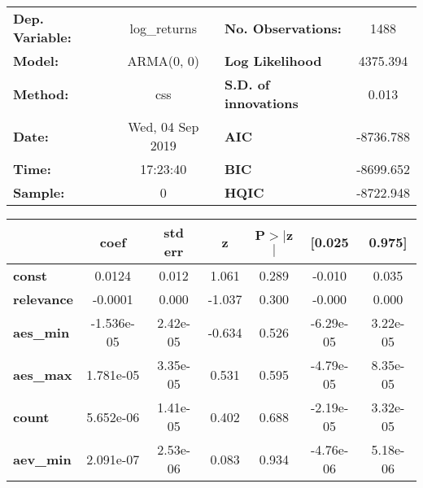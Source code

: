 \begin{center}
\begin{tabular}{lclc}
\toprule
\textbf{Dep. Variable:} &   log\_returns   & \textbf{  No. Observations:  } &    1488     \\
\textbf{Model:}         &    ARMA(0, 0)    & \textbf{  Log Likelihood     } &  4375.394   \\
\textbf{Method:}        &       css        & \textbf{  S.D. of innovations} &   0.013     \\
\textbf{Date:}          & Wed, 04 Sep 2019 & \textbf{  AIC                } & -8736.788   \\
\textbf{Time:}          &     17:23:40     & \textbf{  BIC                } & -8699.652   \\
\textbf{Sample:}        &        0         & \textbf{  HQIC               } & -8722.948   \\
\bottomrule
\end{tabular}
\begin{tabular}{lcccccc}
                   & \textbf{coef} & \textbf{std err} & \textbf{z} & \textbf{P$> |$z$|$} & \textbf{[0.025} & \textbf{0.975]}  \\
\midrule
\textbf{const}     &       0.0124  &        0.012     &     1.061  &         0.289        &       -0.010    &        0.035     \\
\textbf{relevance} &      -0.0001  &        0.000     &    -1.037  &         0.300        &       -0.000    &        0.000     \\
\textbf{aes\_min}  &   -1.536e-05  &     2.42e-05     &    -0.634  &         0.526        &    -6.29e-05    &     3.22e-05     \\
\textbf{aes\_max}  &    1.781e-05  &     3.35e-05     &     0.531  &         0.595        &    -4.79e-05    &     8.35e-05     \\
\textbf{count}     &    5.652e-06  &     1.41e-05     &     0.402  &         0.688        &    -2.19e-05    &     3.32e-05     \\
\textbf{aev\_min}  &    2.091e-07  &     2.53e-06     &     0.083  &         0.934        &    -4.76e-06    &     5.18e-06     \\
\bottomrule
\end{tabular}
\end{center}

